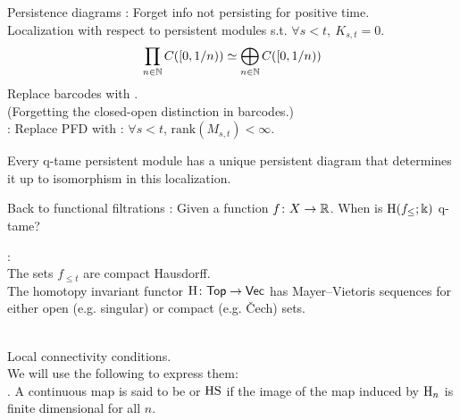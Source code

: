 \begin{frame}{Persistence diagrams}
	: Forget info not persisting for positive time. \\
	\medskip\pause
	Localization with respect to persistent modules s.t. $\forall s<t,\ K_{s,t} = 0$. \\
	\medskip\pause
	\[
	\prod_{n \in \mathbb{N}} C([0,1/n)) \simeq \bigoplus_{n \in \mathbb{N}} C([0,1/n))
	\]
	\smallskip\pause
	Replace barcodes with . \\
	(Forgetting the closed-open distinction in barcodes.) \\
	\bigskip\pause
	: Replace PFD with : $\forall s<t$, $\mathrm{rank}(M_{s,t}) < \infty$. \\
	\medskip\pause
	\begin{theorem}[Chazal et.al. 2016]
		Every q-tame persistent module has a unique persistent diagram that determines it up to isomorphism in this localization.
	\end{theorem}
\end{frame}

\begin{frame}{Back to functional filtrations}
	\pause
	: Given a function $f \colon X \to \mathbb{R}$.
	When is $\mathrm{H}(f_{\le}; \Bbbk)$ q-tame?

	\bigskip\pause
	: \\
	\medskip\pause
	The sets $f_{\le t}$ are compact Hausdorff.\\
	\medskip\pause
	The homotopy invariant functor $\mathrm{H} \colon \mathsf{Top} \to \mathsf{Vec}$ has Mayer--Vietoris sequences for either open (e.g. singular) or compact (e.g. \v{C}ech) sets.

	\bigskip\pause
	 \\
	\medskip\pause
	Local connectivity conditions. \\
	\medskip\pause
	We will use the following to express them: \\
	\medskip\pause
	.
	A continuous map is said to be  or $\mathrm{HS}$ if the image of the map induced by $\mathrm{H}_{n}$ is finite dimensional for all $n$.
\end{frame}

